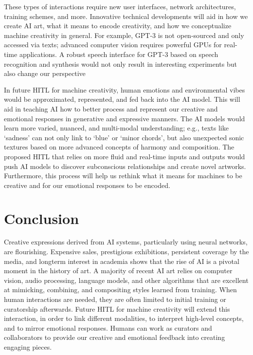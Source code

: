 \documentclass[letterpaper]{article} %
\begin{document}
These types of interactions require new user interfaces, network architectures, training schemes, and more. Innovative technical developments will aid in how we create AI art, what it means to encode creativity, and how we conceptualize machine creativity in general. For example, GPT-3 is not open-sourced and only accessed via texts; advanced computer vision requires powerful GPUs for real-time applications. A robust speech interface for GPT-3 based on speech recognition and synthesis would not only result in interesting experiments but also change our perspective

In future HITL for machine creativity, human emotions and environmental vibes would be approximated, represented, and fed back into the AI model. This will aid in teaching AI how to better process and represent our creative and emotional responses in generative and expressive manners. The AI models would learn more varied, nuanced, and multi-modal understanding; e.g., texts like `sadness' can not only link to `blue' or `minor chords', but also unexpected sonic textures based on more advanced concepts of harmony and composition. The proposed HITL that relies on more fluid and real-time inputs and outputs would push AI models to discover subconscious relationships and create novel artworks. Furthermore, this process will help us rethink what it means for machines to be creative and for our emotional responses to be encoded.

\section{Conclusion}
\label{conclusion}

Creative expressions derived from AI systems, particularly using neural networks, are flourishing. Expensive sales, prestigious exhibitions, persistent coverage by the media, and longterm interest in academia shows that the rise of AI is a pivotal moment in the history of art. A majority of recent AI art relies on computer vision, audio processing, language models, and other algorithms that are excellent at mimicking, combining, and compositing styles learned from training. When human interactions are needed, they are often limited to initial training or curatorship afterwards. Future HITL for machine creativity will extend this interaction, in order to link different modalities, to interpret high-level concepts, and to mirror emotional responses. Humans can work as curators and collaborators to provide our creative and emotional feedback into creating engaging pieces.
\end{document}
